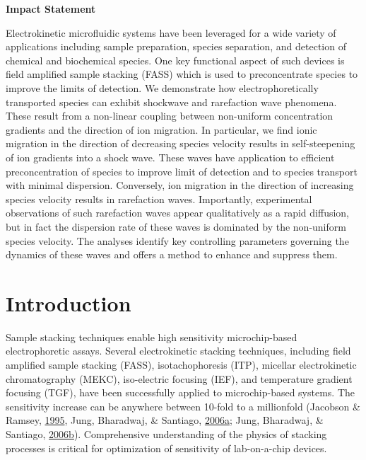 \documentclass[lineno,authoryear]{FLO_v1}%
\theoremstyle{definition}
\begin{document}
\maketitle

\begin{boxtext}

\textbf{Impact Statement}

Electrokinetic microfluidic systems have been leveraged for a wide variety
of applications including sample preparation, species separation, and
detection of chemical and biochemical species. One key functional aspect of
such devices is field amplified sample stacking (FASS) which is used to
preconcentrate species to improve the limits of detection. We demonstrate
how electrophoretically transported species can exhibit shockwave and
rarefaction wave phenomena. These result from a non-linear coupling between
non-uniform concentration gradients and the direction of ion migration. In
particular, we find ionic migration in the direction of decreasing species
velocity results in self-steepening of ion gradients into a shock wave.
These waves have application to efficient preconcentration of species to
improve limit of detection and to species transport with minimal dispersion.
Conversely, ion migration in the direction of increasing species velocity
results in rarefaction waves. Importantly, experimental observations of such
rarefaction waves appear qualitatively as a rapid diffusion, but in fact the
dispersion rate of these waves is dominated by the non-uniform species
velocity. The analyses identify key controlling parameters governing the
dynamics of these waves and offers a method to enhance and suppress them.
\end{boxtext}

\section{Introduction}

Sample stacking techniques enable high sensitivity
microchip-based electrophoretic assays. Several
electrokinetic stacking techniques, including field
amplified sample stacking (FASS), isotachophoresis (ITP),
micellar electrokinetic chromatography (MEKC), iso-electric
focusing (IEF), and temperature gradient focusing (TGF),
have been successfully applied to microchip-based systems.
The sensitivity increase can be anywhere between 10-fold to
a millionfold (Jacobson \& Ramsey, \hyperlink{bib12}{1995},
Jung, Bharadwaj, \& Santiago, \hyperlink{bib13}{2006a};
Jung, Bharadwaj, \& Santiago, \hyperlink{bib14}{2006b}).
Comprehensive understanding of the physics of stacking
processes is critical for optimization of sensitivity of
lab-on-a-chip devices.
\end{document}
